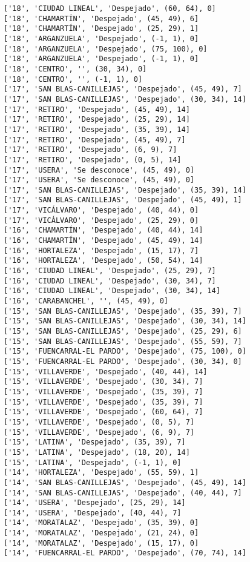 \documentclass[11pt]{article}
\begin{document}
\begin{Verbatim}[commandchars=\\\{\}]
['18', 'CIUDAD LINEAL', 'Despejado', (60, 64), 0]
['18', 'CHAMARTÍN', 'Despejado', (45, 49), 6]
['18', 'CHAMARTÍN', 'Despejado', (25, 29), 1]
['18', 'ARGANZUELA', 'Despejado', (-1, 1), 0]
['18', 'ARGANZUELA', 'Despejado', (75, 100), 0]
['18', 'ARGANZUELA', 'Despejado', (-1, 1), 0]
['18', 'CENTRO', '', (30, 34), 0]
['18', 'CENTRO', '', (-1, 1), 0]
['17', 'SAN BLAS-CANILLEJAS', 'Despejado', (45, 49), 7]
['17', 'SAN BLAS-CANILLEJAS', 'Despejado', (30, 34), 14]
['17', 'RETIRO', 'Despejado', (45, 49), 14]
['17', 'RETIRO', 'Despejado', (25, 29), 14]
['17', 'RETIRO', 'Despejado', (35, 39), 14]
['17', 'RETIRO', 'Despejado', (45, 49), 7]
['17', 'RETIRO', 'Despejado', (6, 9), 7]
['17', 'RETIRO', 'Despejado', (0, 5), 14]
['17', 'USERA', 'Se desconoce', (45, 49), 0]
['17', 'USERA', 'Se desconoce', (45, 49), 0]
['17', 'SAN BLAS-CANILLEJAS', 'Despejado', (35, 39), 14]
['17', 'SAN BLAS-CANILLEJAS', 'Despejado', (45, 49), 1]
['17', 'VICÁLVARO', 'Despejado', (40, 44), 0]
['17', 'VICÁLVARO', 'Despejado', (25, 29), 0]
['16', 'CHAMARTÍN', 'Despejado', (40, 44), 14]
['16', 'CHAMARTÍN', 'Despejado', (45, 49), 14]
['16', 'HORTALEZA', 'Despejado', (15, 17), 7]
['16', 'HORTALEZA', 'Despejado', (50, 54), 14]
['16', 'CIUDAD LINEAL', 'Despejado', (25, 29), 7]
['16', 'CIUDAD LINEAL', 'Despejado', (30, 34), 7]
['16', 'CIUDAD LINEAL', 'Despejado', (30, 34), 14]
['16', 'CARABANCHEL', '', (45, 49), 0]
['15', 'SAN BLAS-CANILLEJAS', 'Despejado', (35, 39), 7]
['15', 'SAN BLAS-CANILLEJAS', 'Despejado', (30, 34), 14]
['15', 'SAN BLAS-CANILLEJAS', 'Despejado', (25, 29), 6]
['15', 'SAN BLAS-CANILLEJAS', 'Despejado', (55, 59), 7]
['15', 'FUENCARRAL-EL PARDO', 'Despejado', (75, 100), 0]
['15', 'FUENCARRAL-EL PARDO', 'Despejado', (30, 34), 0]
['15', 'VILLAVERDE', 'Despejado', (40, 44), 14]
['15', 'VILLAVERDE', 'Despejado', (30, 34), 7]
['15', 'VILLAVERDE', 'Despejado', (35, 39), 7]
['15', 'VILLAVERDE', 'Despejado', (35, 39), 7]
['15', 'VILLAVERDE', 'Despejado', (60, 64), 7]
['15', 'VILLAVERDE', 'Despejado', (0, 5), 7]
['15', 'VILLAVERDE', 'Despejado', (6, 9), 7]
['15', 'LATINA', 'Despejado', (35, 39), 7]
['15', 'LATINA', 'Despejado', (18, 20), 14]
['15', 'LATINA', 'Despejado', (-1, 1), 0]
['14', 'HORTALEZA', 'Despejado', (55, 59), 1]
['14', 'SAN BLAS-CANILLEJAS', 'Despejado', (45, 49), 14]
['14', 'SAN BLAS-CANILLEJAS', 'Despejado', (40, 44), 7]
['14', 'USERA', 'Despejado', (25, 29), 14]
['14', 'USERA', 'Despejado', (40, 44), 7]
['14', 'MORATALAZ', 'Despejado', (35, 39), 0]
['14', 'MORATALAZ', 'Despejado', (21, 24), 0]
['14', 'MORATALAZ', 'Despejado', (15, 17), 0]
['14', 'FUENCARRAL-EL PARDO', 'Despejado', (70, 74), 14]

\end{Verbatim}
\end{document}
